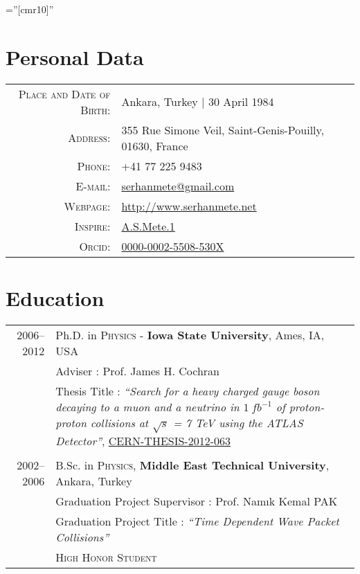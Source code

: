 \documentclass[a4paper,10pt]{article}
\begin{document}
\pagestyle{empty} %

\font\fb=''[cmr10]'' %

\par{\par}

\section{Personal Data}

\begin{tabular}{rl}
    \textsc{Place and Date of Birth:} 			& Ankara, Turkey  | 30 April 1984 							\\
    \textsc{Address:}   					& 355 Rue Simone Veil, Saint-Genis-Pouilly, 01630, France		\\
    \textsc{Phone:}     						& +41 77 225 9483										\\
    \textsc{E-mail:}     						& \href{mailto:serhanmete@gmail.com}{serhanmete@gmail.com}	\\
    \textsc{Webpage:}						& \href{http://www.serhanmete.net}{http://www.serhanmete.net} 	\\
    \textsc{Inspire:}						& \href{https://inspirehep.net/author/profile/A.S.Mete.1}{A.S.Mete.1}  \\
    \textsc{Orcid:}						& \href{https://orcid.org/0000-0002-5508-530X}{0000-0002-5508-530X}
\end{tabular}

\vspace{-1mm}
\section{Education}

\begin{tabular}{r | p{15.5cm}}
\textsc{2006--2012}				&  Ph.D. in \textsc{Physics} - \textbf{Iowa State University}, Ames, IA, USA \\
							& Adviser\phantom{Ttle} : Prof. James H. Cochran 				\\
							& Thesis Title : {\it``Search for a heavy charged gauge boson decaying to a 
							    muon and a neutrino in $1\ fb^{-1}$ of proton-proton collisions 
							    at $\sqrt{s}$ = 7 TeV using the ATLAS Detector''}, \href{http://cds.cern.ch/record/1454661}{CERN-THESIS-2012-063}  \\	
\multicolumn{2}{c}{} \\
\textsc{2002--2006} 				& B.Sc. in \textsc{Physics}, \textbf{Middle East Technical University}, Ankara, Turkey			\\
							& Graduation Project Supervisor : Prof. Nam{\i}k Kemal \textsc{PAK}						\\
							& Graduation Project Title \phantom{rvsor} : \it{``Time Dependent Wave Packet Collisions''} 	\\
							& \normalsize \textsc{High Honor Student}											\\
\end{tabular}
\end{document}
